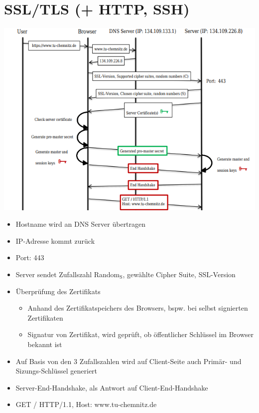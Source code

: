 \documentclass[11pt]{article}
\begin{document}
\section{SSL/TLS (+ HTTP, SSH)}
\label{sec:orgbd2aabf}
\begin{center}
\includegraphics[width=.9\linewidth]{./F32.png}
\end{center}
\begin{itemize}
\item Hostname wird an DNS Server übertragen
\item IP-Adresse kommt zurück
\item Port: 443
\item Server sendet Zufallszahl Random\(_{\text{S}}\), gewählte Cipher Suite, SSL-Version
\item Überprüfung des Zertifikats
\begin{itemize}
\item Anhand des Zertifikatspeichers des Browsers, bspw. bei selbst signierten Zertifikaten
\item Signatur von Zertifikat, wird geprüft, ob öffentlicher Schlüssel im Browser bekannt ist
\end{itemize}
\item Auf Basis von den 3 Zufallszahlen wird auf Client-Seite auch Primär- und Sizungs-Schlüssel generiert
\item Server-End-Handshake, als Antwort auf Client-End-Handshake
\item GET / HTTP/1.1, Host: www.tu-chemnitz.de
\end{itemize}
\end{document}

